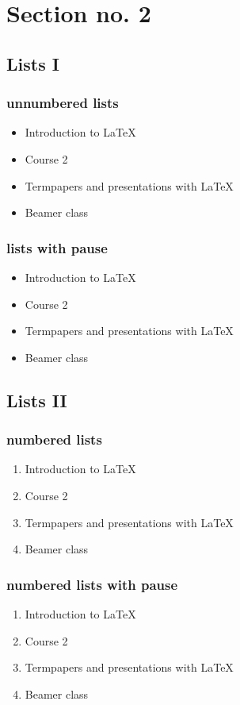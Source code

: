 \documentclass{beamer}
\begin{document}
\section{Section no. 2} 
\subsection{Lists I}
\begin{frame}\frametitle{unnumbered lists}
\begin{itemize}
\item Introduction to  \LaTeX  
\item Course 2 
\item Termpapers and presentations with \LaTeX 
\item Beamer class
\end{itemize} 
\end{frame}

\begin{frame}\frametitle{lists with pause}
\begin{itemize}
\item Introduction to  \LaTeX \pause 
\item Course 2 \pause 
\item Termpapers and presentations with \LaTeX \pause 
\item Beamer class
\end{itemize} 
\end{frame}

\subsection{Lists II}
\begin{frame}\frametitle{numbered lists}
\begin{enumerate}
\item Introduction to  \LaTeX  
\item Course 2 
\item Termpapers and presentations with \LaTeX 
\item Beamer class
\end{enumerate}
\end{frame}

\begin{frame}\frametitle{numbered lists with pause}
\begin{enumerate}
\item Introduction to  \LaTeX \pause 
\item Course 2 \pause 
\item Termpapers and presentations with \LaTeX \pause 
\item Beamer class
\end{enumerate}
\end{frame}
\end{document}
